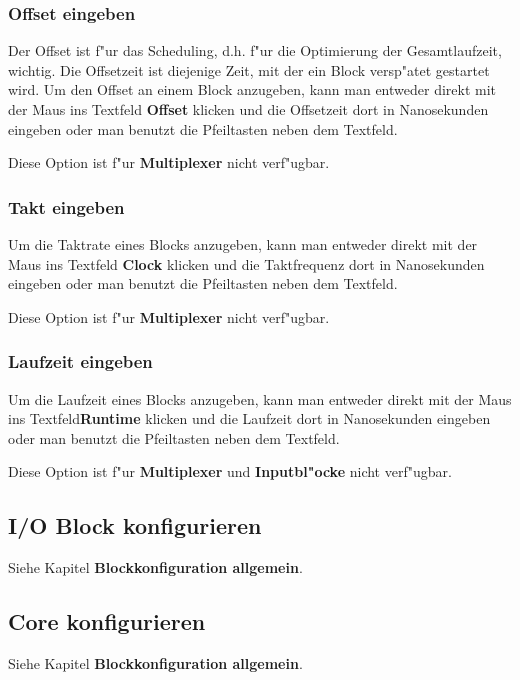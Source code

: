 \documentclass[a4paper,titlepage,12pt,ngerman]{scrbook}
\begin{document}
\subsubsection{Offset eingeben}
Der Offset ist f"ur das Scheduling, d.h. f"ur die Optimierung der Gesamtlaufzeit, wichtig. Die Offsetzeit ist diejenige Zeit, mit der ein Block versp"atet gestartet wird.
Um den Offset an einem Block anzugeben, kann man entweder direkt mit der Maus ins Textfeld {\bf Offset} klicken und die Offsetzeit dort in Nanosekunden eingeben oder man benutzt die Pfeiltasten neben dem Textfeld.\par
Diese Option ist f"ur {\bf Multiplexer} nicht verf"ugbar.
\subsubsection{Takt eingeben}
Um die Taktrate eines Blocks anzugeben, kann man entweder direkt mit der Maus ins Textfeld {\bf Clock} klicken und die Taktfrequenz dort in Nanosekunden eingeben oder man benutzt die Pfeiltasten neben dem Textfeld.\par
Diese Option ist f"ur {\bf Multiplexer} nicht verf"ugbar.
\subsubsection{Laufzeit eingeben}
Um die Laufzeit eines Blocks anzugeben, kann man entweder direkt mit der Maus ins Textfeld{\bf Runtime} klicken und die Laufzeit dort in Nanosekunden eingeben oder man benutzt die Pfeiltasten neben dem Textfeld.\par
Diese Option ist f"ur {\bf Multiplexer} und {\bf Inputbl"ocke} nicht verf"ugbar.


\subsection{I/O Block konfigurieren}
Siehe Kapitel {\bf Blockkonfiguration allgemein}.



\subsection{Core konfigurieren}
Siehe Kapitel {\bf Blockkonfiguration allgemein}.
\end{document}
